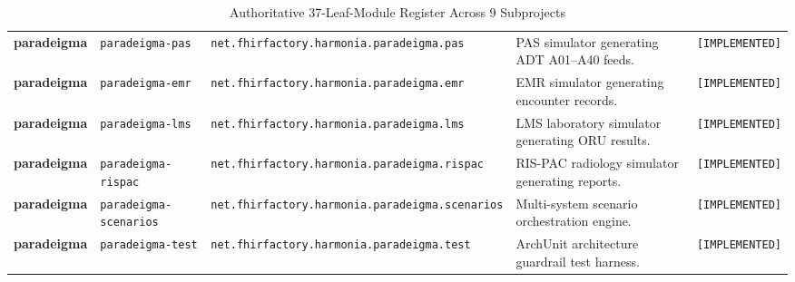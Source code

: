 \begin{table}[htbp]
\begin{tabularx}{\textwidth}{l P{3.2cm} P{4.0cm} Y l}
\textbf{paradeigma} & \texttt{paradeigma-pas} & \nolinkurl{net.fhirfactory.harmonia.paradeigma.pas} & PAS simulator generating ADT A01--A40 feeds. & \texttt{[IMPLEMENTED]} \\
\textbf{paradeigma} & \texttt{paradeigma-emr} & \nolinkurl{net.fhirfactory.harmonia.paradeigma.emr} & EMR simulator generating encounter records. & \texttt{[IMPLEMENTED]} \\
\textbf{paradeigma} & \texttt{paradeigma-lms} & \nolinkurl{net.fhirfactory.harmonia.paradeigma.lms} & LMS laboratory simulator generating ORU results. & \texttt{[IMPLEMENTED]} \\
\textbf{paradeigma} & \texttt{paradeigma-rispac} & \nolinkurl{net.fhirfactory.harmonia.paradeigma.rispac} & RIS-PAC radiology simulator generating reports. & \texttt{[IMPLEMENTED]} \\
\textbf{paradeigma} & \texttt{paradeigma-scenarios} & \nolinkurl{net.fhirfactory.harmonia.paradeigma.scenarios} & Multi-system scenario orchestration engine. & \texttt{[IMPLEMENTED]} \\
\textbf{paradeigma} & \texttt{paradeigma-test} & \nolinkurl{net.fhirfactory.harmonia.paradeigma.test} & ArchUnit architecture guardrail test harness. & \texttt{[IMPLEMENTED]} \\
\bottomrule
\end{tabularx}
\caption{Authoritative 37-Leaf-Module Register Across 9 Subprojects}
\label{tab:authoritative_module_register}
\end{table}

\newpage

